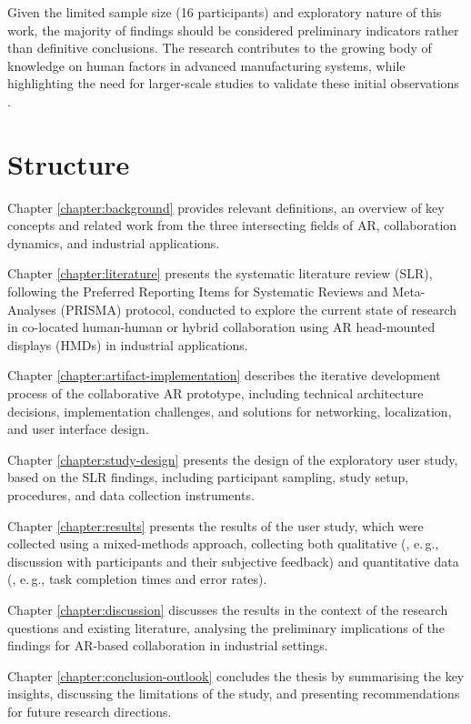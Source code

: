 Given the limited sample size (16 participants) and exploratory nature of this work, the majority of findings should be considered preliminary indicators rather than definitive conclusions. The research contributes to the growing body of knowledge on human factors in advanced manufacturing systems, while highlighting the need for larger-scale studies to validate these initial observations \cite{moencks2022augmented}.


\section{Structure}
Chapter \ref{chapter:background} provides relevant definitions, an overview of key concepts and related work from the three intersecting fields of AR, collaboration dynamics, and industrial applications.

Chapter \ref{chapter:literature} presents the systematic literature review (SLR), following the Preferred Reporting Items for Systematic Reviews and Meta-Analyses (PRISMA) \cite{page2021prisma} protocol, conducted to explore the current state of research in co-located human-human or hybrid collaboration using AR head-mounted displays (HMDs) in industrial applications.

Chapter \ref{chapter:artifact-implementation} describes the iterative development process of the collaborative AR prototype, including technical architecture decisions, implementation challenges, and solutions for networking, localization, and user interface design.

Chapter \ref{chapter:study-design} presents the design of the exploratory user study, based on the SLR findings, including participant sampling, study setup, procedures, and data collection instruments.

Chapter \ref{chapter:results} presents the results of the user study, which were collected using a mixed-methods approach, collecting both qualitative (, e.\,g., discussion with participants and their subjective feedback) and quantitative data (, e.\,g., task completion times and error rates).

Chapter \ref{chapter:discussion} discusses the results in the context of the research questions and existing literature, analysing the preliminary implications of the findings for AR-based collaboration in industrial settings.

Chapter \ref{chapter:conclusion-outlook} concludes the thesis by summarising the key insights, discussing the limitations of the study, and presenting recommendations for future research directions.